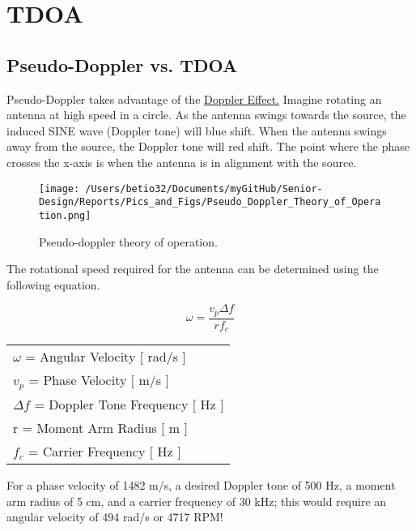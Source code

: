 \documentclass[12pt]{article}
\begin{document}
\section{TDOA}

\subsection{Pseudo-Doppler vs. TDOA}

Pseudo-Doppler takes advantage of the \href{<http://www.dailymotion.com/video/x1h5ogx_carl-sagan-s-cosmos-e10-the-edge-of-forever_tv>}{Doppler Effect.} Imagine rotating an antenna at high speed in a circle. As the antenna swings towards the source, the induced SINE wave (Doppler tone) will blue shift. When the antenna swings away from the source, the Doppler tone will red shift. The point where the phase crosses the x-axis is when the antenna is in alignment with the source.\\

\begin{figure}[!h]
	\centering
	\texttt{[image: /Users/betio32/Documents/myGitHub/Senior-Design/Reports/Pics\_and\_Figs/Pseudo\_Doppler\_Theory\_of\_Operation.png]}
    \caption{Pseudo-doppler theory of operation.} \label{fig:Doppler Theory of Operation}
\end{figure}

\noindent The rotational speed required for the antenna can be determined using the following equation.

\[\omega = \frac{v_p  \Delta f}{r f_c}\]

\begin{center}
\begin{tabular}{l}
$\omega$ = Angular Velocity $[$ rad/s $]$\\
$v_p$ = Phase Velocity $[$ m/s $]$\\
$\Delta f$ = Doppler Tone Frequency $[$ Hz $]$\\
r = Moment Arm Radius $[$ m $]$\\
$f_c$ = Carrier Frequency $[$ Hz $]$\\
\end{tabular}
\end{center}

\noindent For a phase velocity of 1482 m/s, a desired Doppler tone of 500 Hz, a moment arm radius of 5 cm, and a carrier frequency of 30 kHz; this would require an angular velocity of 494 rad/s or 4717 RPM!

\pagebreak
\end{document}
